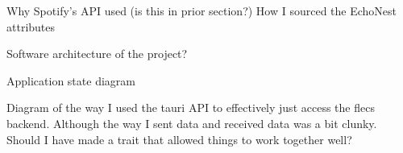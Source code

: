 Why Spotify's API used (is this in prior section?)
How I sourced the EchoNest attributes

Software architecture of the project?

Application state diagram

Diagram of the way I used the tauri API to effectively just access the flecs backend. Although the way I sent data and received data was a bit clunky. Should I have made a trait that allowed things to work together well?